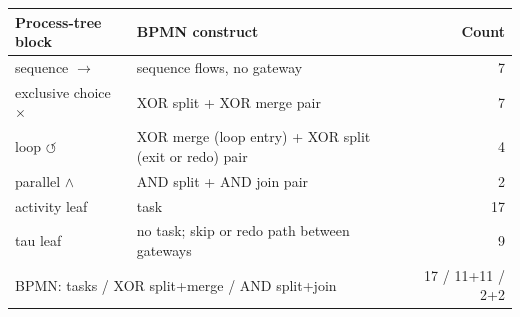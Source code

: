 \begin{tabular}{llr}
\hline
Process-tree block & BPMN construct & Count \\
\hline
sequence $\rightarrow$ & sequence flows, no gateway & 7 \\
exclusive choice $\times$ & XOR split + XOR merge pair & 7 \\
loop $\circlearrowleft$ & XOR merge (loop entry) + XOR split (exit or redo) pair & 4 \\
parallel $\wedge$ & AND split + AND join pair & 2 \\
activity leaf & task & 17 \\
tau leaf & no task; skip or redo path between gateways & 9 \\
\hline
\multicolumn{2}{l}{BPMN: tasks / XOR split+merge / AND split+join} & 17 / 11+11 / 2+2 \\
\hline
\end{tabular}
